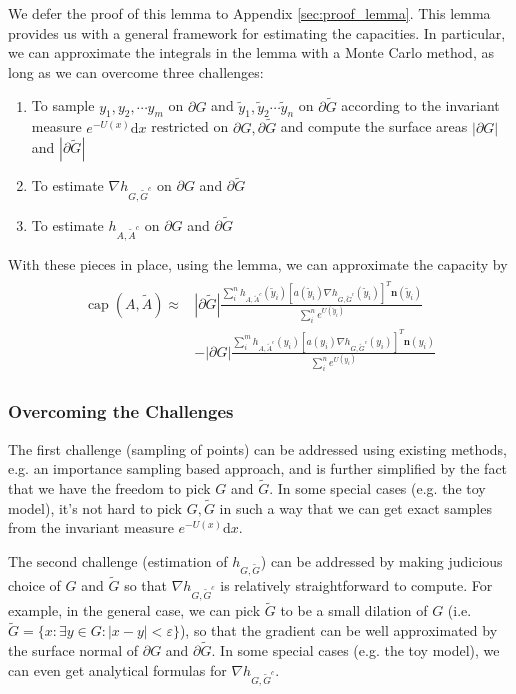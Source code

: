 \documentclass[english, aip, jcp, priprint, graphicx]{revtex4-1}
\theoremstyle{plain}
\theoremstyle{definition}
\theoremstyle{plain}
\begin{document}
We defer the proof of this lemma to Appendix \ref{sec:proof_lemma}. This lemma provides us with a general framework for estimating the capacities.   In particular, we can approximate the integrals in the lemma with a Monte Carlo method, as long as we can overcome three challenges:
\begin{enumerate}
	\item To sample $y_1,y_2,\cdots y_m$ on $\partial G$ and $\tilde y_1,\tilde y_2 \cdots \tilde y_n$ on $\partial \tilde{G}$ according to the invariant measure $e^{- U(x)}\mathrm{d}x$ restricted on $\partial G, \partial \tilde{G}$ and compute the surface areas $|\partial G|$ and $|\partial \tilde G|$

\item To estimate $\nabla h_{G, \tilde{G}^c}$ on $\partial G$ and
$\partial \tilde{G}$

\item To estimate $h_{A, \tilde{A}^c}$ on $\partial G$ and $\partial
\tilde{G}$
\end{enumerate}
With these pieces in place, using the lemma, we can approximate the capacity by
\begin{gather}\label{eq:capesteq}
\begin{array}{cc}
\ensuremath{\operatorname{cap}} (A, \tilde{A}) \approx & 
|\partial \tilde G|\frac{\sum_i^n h_{A,\tilde A^c}(\tilde y_i)[a(\tilde y_i)\nabla h_{G,\tilde G^c}(\tilde y_i)]^T \textbf{n}(\tilde y_i)}{\sum_i^n e^{U(\tilde y_i)}} \\
& - |\partial G|\frac{\sum_i^m h_{A,\tilde A^c}(y_i)[a(y_i)\nabla h_{G,\tilde G^c}(y_i)]^T \textbf{n}(y_i)}{\sum_i^n e^{U(y_i)}} 
\end{array}
\end{gather}

\subsubsection{Overcoming the Challenges}

The first challenge (sampling of points) can be addressed using existing methods, e.g. an importance sampling based approach, and is further simplified by the fact that we have the freedom to pick $G$ and $\tilde{G}$. In some special cases (e.g. the toy model), it's not hard to pick $G, \tilde{G}$ in such a way that we can get exact samples from the invariant measure $e^{- U (x)} \mathrm{d} x$.

The second challenge (estimation of $h_{G,\tilde G}$) can be addressed by making judicious choice of $G$ and
$\tilde{G}$ so that $\nabla h_{G, \tilde{G}^c}$ is relatively straightforward
to compute. For example, in the general case, we can pick $\tilde{G}$ to be a
small dilation of $G$ (i.e. $\tilde{G} = \{ x : \exists y \in G : | x - y | <
\varepsilon \}$), so that the gradient can be well approximated by the surface
normal of $\partial G$ and $\partial \tilde{G}$. In some special cases (e.g.
the toy model), we can even get analytical formulas for $\nabla h_{G,
\tilde{G}^c}$.
\end{document}
